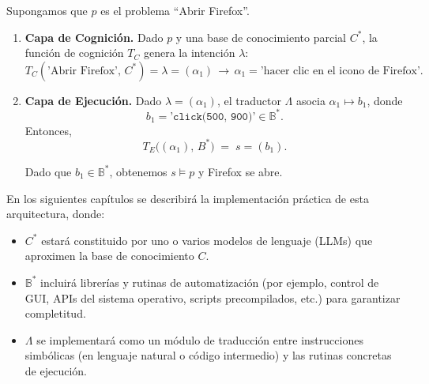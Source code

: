 Supongamos que \(p\) es el problema “Abrir Firefox”.  
\begin{enumerate}
    \item \textbf{Capa de Cognición.} Dado \(p\) y una base de conocimiento parcial \(C^*\), la función de cognición \(T_C\) genera la intención \(\lambda\):
   \begin{equation}
    T_C(\text{'Abrir Firefox'},\,C^*) = \lambda = (\alpha_1)\, \rightarrow\,
    \alpha_1 = \text{'hacer clic en el icono de Firefox'}.
    \end{equation}
    \item \textbf{Capa de Ejecución.}  
    Dado \(\lambda = (\alpha_1)\), el traductor \(\Lambda\) asocia  
    \(\alpha_1 \mapsto b_1\), donde  
    \begin{equation}
    b_1 = \texttt{'click(500, 900)'} \in \mathbb{B}^*.
    \end{equation}
    Entonces,
   \begin{equation}
    T_E\bigl((\alpha_1),\,B^*\bigr) \;=\; s = (b_1).
    \end{equation}

    Dado que \(b_1 \in \mathbb{B}^*\), obtenemos \(s \models p\) y Firefox se abre.
\end{enumerate}

\medskip

En los siguientes capítulos se describirá la implementación práctica de esta
arquitectura, donde:
\begin{itemize}
    \item \(C^*\) estará constituido por uno o varios modelos de lenguaje (LLMs) que aproximen la base de conocimiento \(C\).
    \item \(\mathbb{B}^*\) incluirá librerías y rutinas de automatización (por ejemplo, control de GUI, APIs del sistema operativo, scripts precompilados, etc.) para garantizar completitud.
    \item \(\Lambda\) se implementará como un módulo de traducción entre instrucciones simbólicas (en lenguaje natural o código intermedio) y las rutinas concretas de ejecución.
\end{itemize}